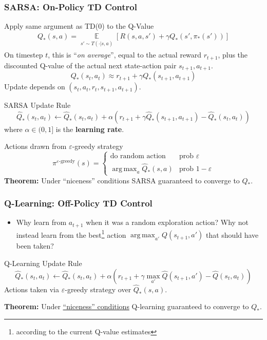 \documentclass[10pt,a4paper]{beamer}
\DeclareMathOperator*{\argmax}{arg\,max}
\begin{document}
%
\begin{frame}
	\frametitle{SARSA: On-Policy TD Control}
Apply same argument as TD(0) to the Q-Value
\begin{align*}
	Q_*(s,a) = 
	\underset{\substack{s' \sim T(\cdot | s, a)}}{\mathbb{E}} \left[ R(s,a,s') + \gamma Q_*(s', \pi_*(s')) \right]
\end{align*}
\pause
On timestep $t$, this is ``\textit{on average}'', equal to the actual reward $r_{t+1}$, plus the discounted Q-value of the actual next state-action pair $s_{t+1},a_{t+1}$.
$$
Q_{*}(s_t, a_t) \approx r_{t+1} + \gamma Q_{*}(s_{t+1}, a_{t+1})
$$
Update depends on $(s_t, a_t, r_t, s_{t+1}, a_{t+1})$.
\pause
\begin{block}{SARSA Update Rule}
$$
\hat{Q}_*(s_t, a_t) \leftarrow  \hat{Q}_*(s_t, a_t) + \alpha 
\left( r_{t+1} + \gamma \hat{Q}_*(s_{t+1}, a_{t+1}) - \hat{Q}_*(s_t, a_t) \right) 
$$
where $\alpha \in (0,1]$ is the \textbf{learning rate}.
\end{block}
\pause
Actions drawn from $\varepsilon$-greedy strategy 
$$
\pi^{\varepsilon\text{-greedy}}(s) = \begin{cases}
 \text{do random action} & \text{prob } \varepsilon \\
 \argmax_a \hat{Q}_*(s,a) & \text{prob } 1-\varepsilon 
\end{cases}
$$
\pause
\textbf{Theorem:} Under ``niceness'' conditions 
SARSA guaranteed to converge to $Q_*$. 
	
\end{frame}

%
\begin{frame}
\frametitle{Q-Learning: Off-Policy TD Control}
	\begin{itemize}
		\item Why learn from $a_{t+1}$ when it was a random exploration action? 
		Why not instead learn
		from the best\footnote{according to the current Q-value estimates} action $\argmax_{a'} Q(s_{t+1}, a')$ that should have been taken?
	\end{itemize}
	\pause
	
\begin{block}{Q-Learning Update Rule}
$$
\hat{Q}_*(s_t, a_t)  \leftarrow \hat{Q}_*(s_t,a_t)
+ \alpha \left( 
r_{t+1} + \gamma \max_{a'} \hat{Q}(s_{t+1}, a') - \hat{Q}(s_t, a_t)
\right)
$$
Actions taken via $\varepsilon$-greedy strategy over $\hat{Q}_*(s,a)$.
\end{block}
\pause
\textbf{Theorem:} Under \href{https://link.springer.com/article/10.1007/BF00992698}{``niceness'' conditions} 
Q-learning guaranteed to converge to $Q_*$. 
\end{frame}
\end{document}
